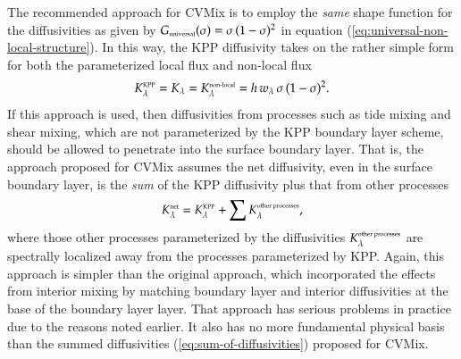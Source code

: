 The recommended approach for CVMix is to employ the {\it same} shape
function for the diffusivities as given by $G_{\mbox{\tiny
    universal}}(\sigma)= \sigma \, (1-\sigma)^{2}$ in equation
(\ref{eq:universal-non-local-structure}).  In this way, the KPP
diffusivity takes on the rather simple form for both the parameterized
local flux and non-local flux
\begin{equation}
 K^{\mbox{\tiny KPP}}_{\lambda}  = K_{\lambda}  =  K^{\mbox{\tiny non-local}}_{\lambda} = h \, w_{\lambda} \, \sigma \, (1-\sigma)^{2}.
\label{eq:universal-diffusivity}
\end{equation}
If this approach is used, then diffusivities from processes such as
tide mixing and shear mixing, which are not parameterized by the KPP
boundary layer scheme, should be allowed to penetrate into the surface
boundary layer.  That is, the approach proposed for CVMix assumes the
net diffusivity, even in the surface boundary layer, is the {\it sum}
of the KPP diffusivity plus that from other processes
\begin{equation}
 K_{\lambda}^{\mbox{\tiny net}} =  K^{\mbox{\tiny KPP}}_{\lambda} + \sum  K^{\mbox{\tiny other processes}}_{\lambda},
\label{eq:sum-of-diffusivities}
\end{equation}
where those other processes parameterized by the diffusivities
$K^{\mbox{\tiny other processes}}_{\lambda}$ are spectrally localized
away from the processes parameterized by KPP.  Again, this approach is
simpler than the original \cite{LargeKPP} approach, which incorporated
the effects from interior mixing by matching boundary layer and
interior diffusivities at the base of the boundary layer layer.  That
approach has serious problems in practice due to the reasons noted
earlier.  It also has no more fundamental physical basis than the
summed diffusivities (\ref{eq:sum-of-diffusivities}) proposed for
CVMix.

